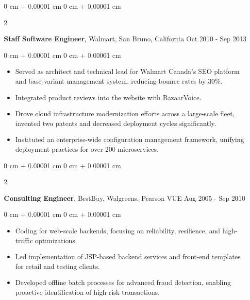\documentclass[10pt, letterpaper]{article}
\newenvironment{highlights}{
    \begin{itemize}[
        topsep=0.10 cm,
        parsep=0.10 cm,
        partopsep=0pt,
        itemsep=0pt,
        leftmargin=0 cm + 10pt
    ]
}{
    \end{itemize}
} %
\newenvironment{onecolentry}{
    \begin{adjustwidth}{
        0 cm + 0.00001 cm
    }{
        0 cm + 0.00001 cm
    }
}{
    \end{adjustwidth}
} %
\newenvironment{twocolentry}[2][]{
    \onecolentry
    \def\secondColumn{#2}
    \setcolumnwidth{\fill, 4.5 cm}
    \begin{paracol}{2}
}{
    \switchcolumn \raggedleft \secondColumn
    \end{paracol}
    \endonecolentry
} %
\begin{document}
        \vspace{0.20 cm}
        \begin{twocolentry}{
            Oct 2010 - Sep 2013
        }
            \textbf{Staff Software Engineer}, Walmart, San Bruno, California\end{twocolentry}
        \vspace{0.10 cm}
        \begin{onecolentry}
            \begin{highlights}
                \item Served as architect and technical lead for Walmart Canada's SEO platform and base-variant management system, reducing bounce rates by 30\%.
                \item Integrated product reviews into the website with BazaarVoice.
                \item Drove cloud infrastructure modernization efforts across a large-scale fleet, invented two patents and decreased deployment cycles significantly.
                \item Instituted an enterprise-wide configuration management framework, unifying deployment practices for over 200 microservices.
            \end{highlights}
        \end{onecolentry}

        \vspace{0.20 cm}
        \begin{twocolentry}{
            Aug 2005 - Sep 2010
        }
            \textbf{Consulting Engineer}, BestBuy, Walgreens, Pearson VUE\end{twocolentry}
        \vspace{0.10 cm}
        \begin{onecolentry}
            \begin{highlights}
                \item Coding for web-scale backends, focusing on reliability, resilience, and high-traffic optimizations.
                \item Led implementation of JSP-based backend services and front-end templates for retail and testing clients.
                \item Developed offline batch processes for advanced fraud detection, enabling proactive identification of high-risk transactions.
            \end{highlights}
        \end{onecolentry}
\end{document}
